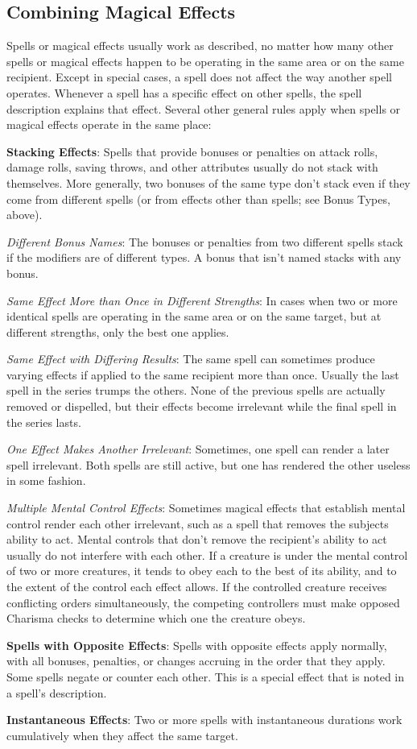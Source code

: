 \subsection{Combining Magical Effects}
Spells or magical effects usually work as described, no matter how many other spells or magical effects happen to be operating in the same area or on the same recipient. Except in special cases, a spell does not affect the way another spell operates. Whenever a spell has a specific effect on other spells, the spell description explains that effect. Several other general rules apply when spells or magical effects operate in the same place:

\textbf{Stacking Effects}: Spells that provide bonuses or penalties on attack rolls, damage rolls, saving throws, and other attributes usually do not stack with themselves. More generally, two bonuses of the same type don't stack even if they come from different spells (or from effects other than spells; see Bonus Types, above).

\textit{Different Bonus Names}: The bonuses or penalties from two different spells stack if the modifiers are of different types. A bonus that isn't named stacks with any bonus.

\textit{Same Effect More than Once in Different Strengths}: In cases when two or more identical spells are operating in the same area or on the same target, but at different strengths, only the best one applies.

\textit{Same Effect with Differing Results}: The same spell can sometimes produce varying effects if applied to the same recipient more than once. Usually the last spell in the series trumps the others. None of the previous spells are actually removed or dispelled, but their effects become irrelevant while the final spell in the series lasts.

\textit{One Effect Makes Another Irrelevant}: Sometimes, one spell can render a later spell irrelevant. Both spells are still active, but one has rendered the other useless in some fashion.

\textit{Multiple Mental Control Effects}: Sometimes magical effects that establish mental control render each other irrelevant, such as a spell that removes the subjects ability to act. Mental controls that don't remove the recipient's ability to act usually do not interfere with each other. If a creature is under the mental control of two or more creatures, it tends to obey each to the best of its ability, and to the extent of the control each effect allows. If the controlled creature receives conflicting orders simultaneously, the competing controllers must make opposed Charisma checks to determine which one the creature obeys.

\textbf{Spells with Opposite Effects}: Spells with opposite effects apply normally, with all bonuses, penalties, or changes accruing in the order that they apply. Some spells negate or counter each other. This is a special effect that is noted in a spell's description.

\textbf{Instantaneous Effects}: Two or more spells with instantaneous durations work cumulatively when they affect the same target.